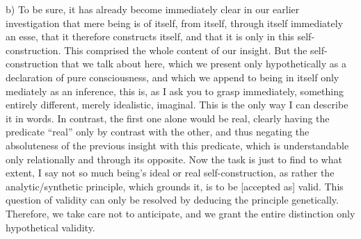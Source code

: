 b) To be sure, it has already become immediately clear
in our earlier investigation that mere being is
of itself, from itself, through itself immediately an esse,
that it therefore constructs itself,
and that it is only in this self-construction.
This comprised the whole content of our insight.
But the self-construction that we talk about here,
which we present only hypothetically as
a declaration of pure consciousness,
and which we append to being in itself
only mediately as an inference,
this is, as I ask you to grasp immediately,
something entirely different, merely idealistic, imaginal.
This is the only way I can describe it in words.
In contrast, the first one alone would be real,
clearly having the predicate “real”
only by contrast with the other,
and thus negating the absoluteness of
the previous insight with this predicate,
which is understandable only relationally
and through its opposite.
Now the task is just to find to what extent,
I say not so much being's ideal or real self-construction,
as rather the analytic/synthetic principle,
which grounds it, is to be [accepted as] valid.
This question of validity can only be resolved
by deducing the principle genetically.
Therefore, we take care not to anticipate,
and we grant the entire distinction
only hypothetical validity.


